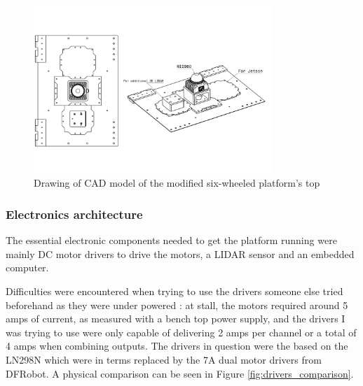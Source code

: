 \documentclass[12pt]{article}
\begin{document}
        \begin{figure}[H]
            \centering
            \includegraphics[width=0.8\textwidth]{Images/RoverV1.pdf}
            \caption{Drawing of CAD model of the modified six-wheeled platform's top}
            \label{fig:full_cad_model}
        \end{figure}

        \subsubsection{Electronics architecture}
            The essential electronic components needed to get the platform running were mainly DC motor drivers to drive the motors, a LIDAR sensor and an embedded computer.
            
            Difficulties were encountered when trying to use the drivers someone else tried beforehand as they were under powered : at stall, the motors required around 5 amps of current, as measured with a bench top power supply, and the drivers I was trying to use were only capable of delivering 2 amps per channel or a total of 4 amps when combining outputs. The drivers in question were the based on the LN298N which were in terms replaced by the 7A dual motor drivers from DFRobot. A physical comparison can be seen in Figure \ref{fig:drivers_comparison}.
        
\end{document}
